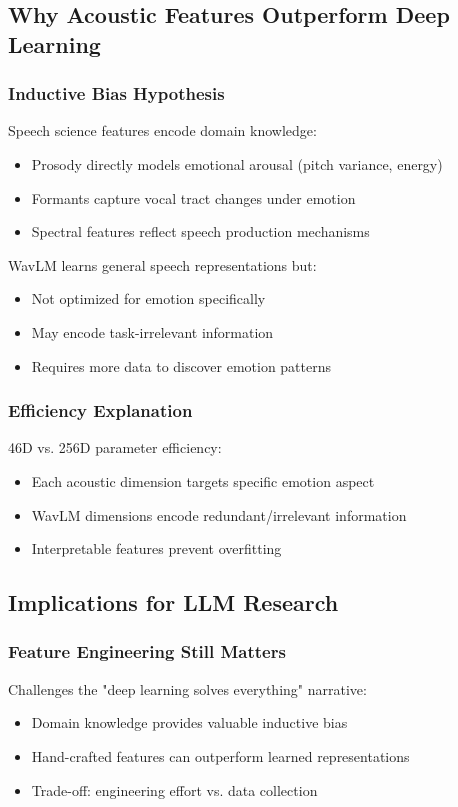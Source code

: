 
\subsection{Why Acoustic Features Outperform Deep Learning}

\subsubsection{Inductive Bias Hypothesis}
Speech science features encode domain knowledge:
\begin{itemize}
    \item Prosody directly models emotional arousal (pitch variance, energy)
    \item Formants capture vocal tract changes under emotion
    \item Spectral features reflect speech production mechanisms
\end{itemize}

WavLM learns general speech representations but:
\begin{itemize}
    \item Not optimized for emotion specifically
    \item May encode task-irrelevant information
    \item Requires more data to discover emotion patterns
\end{itemize}

\subsubsection{Efficiency Explanation}
46D vs. 256D parameter efficiency:
\begin{itemize}
    \item Each acoustic dimension targets specific emotion aspect
    \item WavLM dimensions encode redundant/irrelevant information
    \item Interpretable features prevent overfitting
\end{itemize}

\subsection{Implications for LLM Research}

\subsubsection{Feature Engineering Still Matters}
Challenges the "deep learning solves everything" narrative:
\begin{itemize}
    \item Domain knowledge provides valuable inductive bias
    \item Hand-crafted features can outperform learned representations
    \item Trade-off: engineering effort vs. data collection
\end{itemize}

